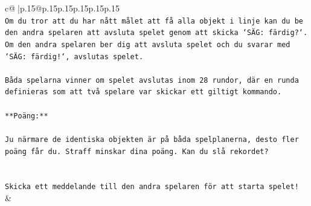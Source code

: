 \documentclass{article}
\begin{document}
{\begin{supertabular}{c@{$\;$}|p{.15\linewidth}@{}p{.15\linewidth}p{.15\linewidth}p{.15\linewidth}p{.15\linewidth}p{.15\linewidth}}
{{{\\ 
\texttt{Om du tror att du har nått målet att få alla objekt i linje kan du be den andra spelaren att avsluta spelet genom att skicka `SÄG: färdig?`. Om den andra spelaren ber dig att avsluta spelet och du svarar med `SÄG: färdig!`, avslutas spelet.} \\
\\ 
\texttt{Båda spelarna vinner om spelet avslutas inom 28 rundor, där en runda definieras som att två spelare var skickar ett giltigt kommando.} \\
\\ 
\texttt{**Poäng:**} \\
\\ 
\texttt{Ju närmare de identiska objekten är på båda spelplanerna, desto fler poäng får du. Straff minskar dina poäng. Kan du slå rekordet?} \\
\\ 
\\ 
\texttt{Skicka ett meddelande till den andra spelaren för att starta spelet!} \\
            }
        }
    }
    & \\ \\


\end{supertabular}}
\end{document}
